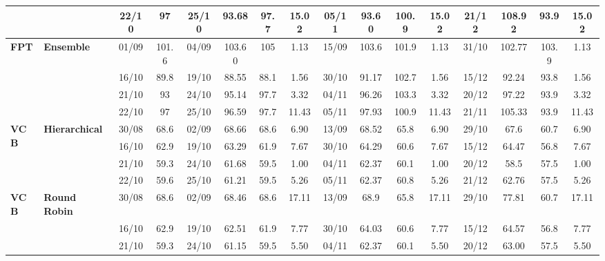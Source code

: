 \documentclass{ieeeaccess}
\begin{document}
\begin{table}[!h]
\begin{tabular}{llcc|cccc|cccc|cccc}
&
& 22/10 & 97 & 25/10 & 93.68 & 97.7 & 15.02 & 05/11 & 93.60 & 100.9 & 15.02 & 21/12 & 108.92 & 93.9 & 15.02 \\
\midrule



\multirow{4}{*}{\textbf{FPT}} 
& \textbf{Ensemble}
& 01/09 & 101.6 & 04/09 & 103.60 & 105 & 1.13 & 15/09 & 103.6 & 101.9 & 1.13 & 31/10 & 102.77 & 103.9 & 1.13 \\

&
& 16/10 & 89.8 & 19/10 & 88.55 & 88.1 & 1.56 & 30/10 & 91.17 & 102.7 & 1.56 & 15/12 & 92.24 & 93.8 & 1.56 \\

&
& 21/10 & 93 & 24/10 & 95.14 & 97.7 & 3.32 & 04/11 & 96.26 & 103.3 & 3.32 & 20/12 & 97.22 & 93.9 & 3.32 \\

&
& 22/10 & 97 & 25/10 & 96.59 & 97.7 & 11.43 & 05/11 & 97.93 & 100.9 & 11.43 & 21/11 & 105.33 & 93.9 & 11.43 \\
\midrule




\multirow{4}{*}{\textbf{VCB}} 
& \textbf{Hierarchical}
& 30/08 & 68.6 & 02/09 & 68.66 & 68.6 & 6.90 & 13/09 & 68.52 & 65.8 & 6.90 & 29/10 & 67.6 & 60.7 & 6.90 \\

&
& 16/10 & 62.9 & 19/10 & 63.29 & 61.9 & 7.67 & 30/10 & 64.29 & 60.6 & 7.67 & 15/12 & 64.47 & 56.8 & 7.67 \\

&
& 21/10 & 59.3 & 24/10 & 61.68 & 59.5 & 1.00 & 04/11 & 62.37 & 60.1 & 1.00 & 20/12 & 58.5 & 57.5 & 1.00 \\

&
& 22/10 & 59.6 & 25/10 & 61.21 & 59.5 & 5.26 & 05/11 & 62.37 & 60.8 & 5.26 & 21/12 & 62.76 & 57.5 & 5.26 \\
\midrule


\multirow{4}{*}{\textbf{VCB}} 
& \textbf{Round Robin}
& 30/08 & 68.6 & 02/09 & 68.46 & 68.6 & 17.11 & 13/09 & 68.9 & 65.8 & 17.11 & 29/10 & 77.81 & 60.7 & 17.11 \\

&
& 16/10 & 62.9 & 19/10 & 62.51 & 61.9 & 7.77 & 30/10 & 64.03 & 60.6 & 7.77 & 15/12 & 64.57 & 56.8 & 7.77 \\

&
& 21/10 & 59.3 & 24/10 & 61.15 & 59.5 & 5.50 & 04/11 & 62.37 & 60.1 & 5.50 & 20/12 & 63.00 & 57.5 & 5.50 \\


\end{tabular}
\end{table}
\end{document}
